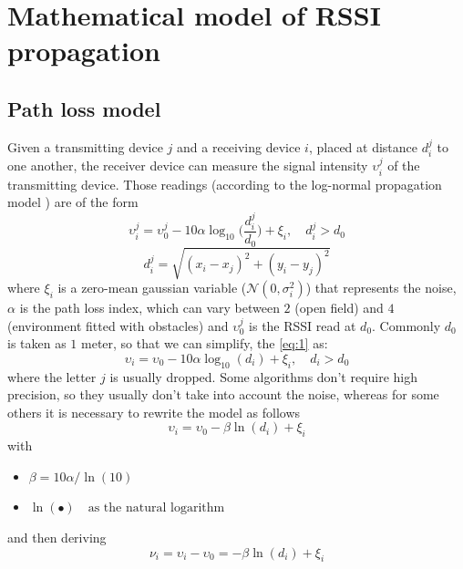 \documentclass[12pt]{report}
\begin{document}
\clearpage

\chapter{Mathematical model of RSSI propagation}
\section{Path loss model}
Given a transmitting device $j$ and a receiving device $i$, placed at distance $d_i^j$ to one another, the receiver device can measure the signal intensity $\upsilon_i^j$ of the transmitting device. Those readings (according to the log-normal propagation model  \cite{MUNOZ200923}) are of the form
\begin{equation}
\upsilon_i^j = \upsilon_0^j-10\alpha\log_{10}\bigg(\frac{d_i^j}{d_0}\bigg) + \xi_i, \quad d_i^j>d_0
\label{eq:1}
\end{equation}
\begin{equation}
    d_i^j=\sqrt{(x_i-x_j)^2+(y_i-y_j)^2}
\end{equation}
where $\xi_i$ is a zero-mean gaussian variable ($\mathcal{N}(0,\sigma^2_i)$) that represents the noise, $\alpha$ is the path loss index, which can vary between $2$ (open field) and $4$ (environment fitted with obstacles) and $\upsilon_0^j$ is the RSSI read at $d_0$. Commonly $d_0$ is taken as $1$ meter, so that we can simplify, the \ref{eq:1} as:
\begin{equation}
\upsilon_i = \upsilon_0-10\alpha\log_{10}(d_i) + \xi_i, \quad d_i>d_0
\label{eq:2}
\end{equation}
where the letter $j$ is usually dropped.
Some algorithms don't require high precision, so they usually don't take into account the noise, whereas for some others it is necessary to rewrite the model as follows
\begin{equation}
\upsilon_i= \upsilon_0-\beta\ln(d_i) + \xi_i
\end{equation}
with
\begin{itemize}
    \item $\beta=10\alpha/\ln(10)$
    \item $\ln(\bullet)\quad \text{as the natural logarithm}$
\end{itemize}
and then deriving
\begin{equation}
\nu_i = \upsilon_i-\upsilon_0= -\beta\ln(d_i) + \xi_i
\label{eq:5}
\end{equation}
\clearpage
\end{document}
